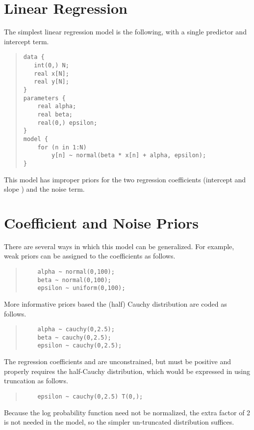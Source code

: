 \section{Linear Regression}

The simplest linear regression model is the following, with a single
predictor and intercept term.

\begin{quote}
\begin{Verbatim}
data {
   int(0,) N;
   real x[N];
   real y[N];
}
parameters {
    real alpha;
    real beta;
    real(0,) epsilon;
}
model {
    for (n in 1:N)
        y[n] ~ normal(beta * x[n] + alpha, epsilon);
}
\end{Verbatim}
\end{quote}
%
This model has improper priors for the two regression coefficients
(intercept  and slope ) and the noise term.

\section{Coefficient and Noise Priors}

There are several ways in which this model can be generalized.  
For example, weak priors can be assigned to the coefficients as follows.
%
\begin{quote}
\begin{Verbatim}
    alpha ~ normal(0,100);
    beta ~ normal(0,100);
    epsilon ~ uniform(0,100);
\end{Verbatim}
\end{quote}
%
More informative priors based the (half) Cauchy distribution are coded
as follows.
%
\begin{quote}
\begin{Verbatim}
    alpha ~ cauchy(0,2.5);
    beta ~ cauchy(0,2.5);
    epsilon ~ cauchy(0,2.5);
\end{Verbatim}
\end{quote}
%
The regression coefficients  and  are
unconstrained, but  must be positive and properly
requires the half-Cauchy distribution, which would be expressed in
\Stan using truncation as follows.
%
\begin{quote}
\begin{Verbatim}
    epsilon ~ cauchy(0,2.5) T(0,);
\end{Verbatim}
\end{quote}
%
Because the log probability function need not be normalized, the extra
factor of 2 is not needed in the model, so the simpler un-truncated
distribution suffices.

